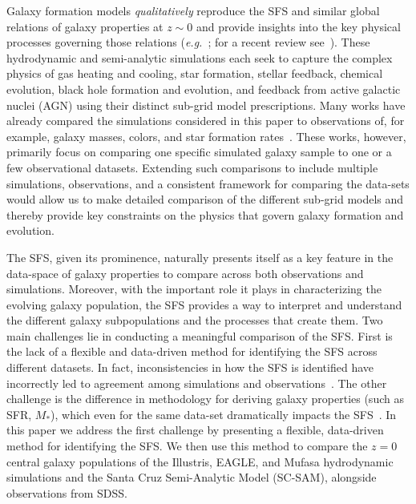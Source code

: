 \documentclass[tighten, preprint]{aastex62}
\begin{document}
Galaxy formation models \emph{qualitatively} reproduce the SFS and 
similar global relations of galaxy properties at $z\sim0$ 
and provide insights into the key physical processes governing those relations 
(\emph{e.g.}~\citealt{vogelsberger2014,genel2014, schaye2015, somerville2015a, dave2017}; 
for a recent review see~\citealt{somerville2015}). These hydrodynamic and 
semi-analytic simulations each seek to capture the complex physics of 
gas heating and cooling, star formation, stellar feedback, chemical 
evolution, black hole formation and evolution, and feedback from active 
galactic nuclei (AGN) using their distinct sub-grid model prescriptions.
Many works have already compared the simulations considered in this paper to 
observations of, for example, galaxy masses, colors, and star formation 
rates~\citep[\emph{e.g.}][]{vogelsberger2014, genel2014, torrey2014, sparre2015, schaye2015, bluck2016, dave2017, somerville2015}. 
These works, however, primarily focus on comparing one specific simulated 
galaxy sample to one or a few observational datasets. Extending such 
comparisons to include multiple simulations, observations, and a 
consistent framework for comparing the data-sets would allow us to make 
detailed comparison of the different sub-grid models and thereby provide 
key constraints on the physics that govern galaxy formation and evolution.  

The SFS, given its prominence, naturally presents itself as a key feature 
in the data-space of galaxy properties to compare across both observations 
and simulations. Moreover, with the important role it plays in characterizing 
the evolving galaxy population, the SFS provides a way to interpret and 
understand the different galaxy subpopulations and the processes that create them.
Two main challenges lie in conducting a meaningful comparison of the SFS. First 
is the lack of a flexible and data-driven method for identifying the SFS across 
different datasets. In fact, inconsistencies in how the SFS is identified 
have incorrectly led to agreement among simulations and 
observations~\citep[\emph{e.g.}][see Appendix~\ref{app:literature}]{somerville2015}. %
The other challenge is the difference in methodology for 
deriving galaxy properties (such as SFR, $M_*$), which even for the same 
data-set dramatically impacts the SFS~\citep[\emph{e.g.}][]{speagle2014}. 
In this paper we address the first challenge by presenting a flexible, 
data-driven method for identifying the SFS. We then use this method to compare 
the $z = 0$ central galaxy populations of the Illustris, EAGLE, and {\sc Mufasa} 
hydrodynamic simulations and the Santa Cruz Semi-Analytic Model (SC-SAM), alongside 
observations from SDSS. 
\end{document}
